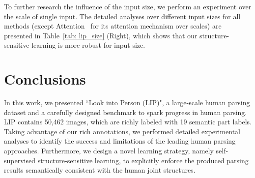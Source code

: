\documentclass[10pt,twocolumn,letterpaper]{article}
\begin{document}
To further research the influence of the input size, we perform an experiment over the scale of single input. The detailed analyses over different input sizes for all methods (except Attention~\cite{chen2015attention} for its attention mechanism over scales) are presented in Table~\ref{tab: lip_size} (Right), which shows that our structure-sensitive learning is more robust for input size.

\section{Conclusions}
In this work, we presented ``Look into Person (LIP)", a large-scale human parsing dataset and a carefully designed benchmark to spark progress in human parsing. LIP contains 50,462 images, which are richly labeled with 19 semantic part labels. Taking advantage of our rich annotations, we performed detailed experimental analyses to identify the success and limitations of the leading human parsing approaches. Furthermore, we design a novel learning strategy, namely self-supervised structure-sensitive learning, to explicitly enforce the produced parsing results semantically consistent with the human joint structures. 


{\small


}
\end{document}
